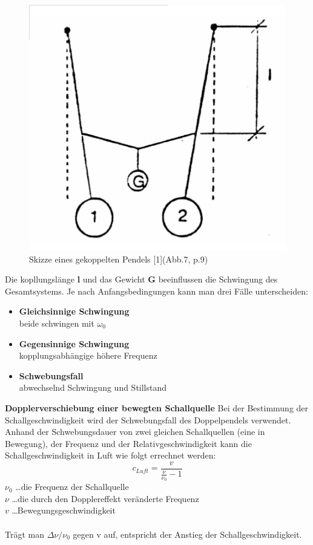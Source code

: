 \documentclass[12pt,a4paper]{article}
\begin{document}
\begin{multicols}{2}
\begin{figure}[H]
	\centering
	\includegraphics[scale=0.4]{./figure/skizze_kopplung.png}
	\caption{Skizze eines gekoppelten Pendels [1](Abb.7, p.9)}
	\label{fig:gekoppelt_skizze}
\end{figure}
Die kopllungslänge \textbf{l} und das Gewicht \textbf{G} beeinflussen die Schwingung des Gesamtsystems. Je nach Anfangsbedingungen kann man drei Fälle unterscheiden:\\
\begin{itemize}
	\item  \textbf{Gleichsinnige Schwingung} \\ beide schwingen mit $\omega_0$
	\item  \textbf{Gegensinnige Schwingung} \\ kopplungsabhängige höhere Frequenz
	\item  \textbf{Schwebungsfall} \\ abwechselnd Schwingung und Stillstand
\end{itemize}


\textbf{Dopplerverschiebung einer bewegten Schallquelle}
Bei der Bestimmung der Schallgeschwindigkeit wird der Schwebungsfall des Doppelpendels verwendet. Anhand der Schwebungsdauer von zwei gleichen Schallquellen (eine in Bewegung), der Frequenz und der Relativgeschwindigkeit kann die Schallgeschwindigkeit in Luft wie folgt errechnet werden:
$$c_{Luft} = \frac{v}{\frac{\nu}{\nu_0}-1}$$
$\nu_0$ \ldots die Frequenz der Schallquelle\\ 
$\nu$ \ldots die durch den Dopplereffekt veränderte Frequenz\\
$v$ \ldots Bewegungsgeschwindigkeit\\
\\
Trägt man $\Delta \nu / \nu_0$ gegen v auf, entspricht der Anstieg der Schallgeschwindigkeit.


\end{multicols}
\end{document}
